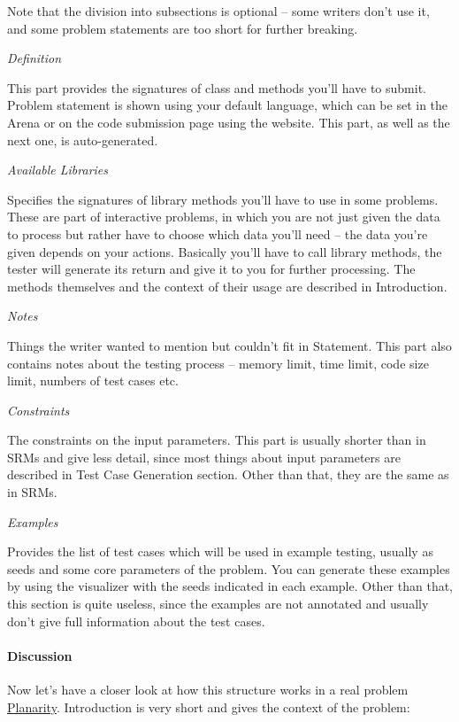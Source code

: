 Note that the division into subsections is optional -- some writers
don't use it, and some problem statements are too short for further
breaking.

\emph{Definition}

This part provides the signatures of class and methods you'll have to
submit. Problem statement is shown using your default language, which
can be set in the Arena or on the code submission page using the
website. This part, as well as the next one, is auto-generated.

\emph{Available Libraries}

Specifies the signatures of library methods you'll have to use in some
problems. These are part of interactive problems, in which you are not
just given the data to process but rather have to choose which data
you'll need -- the data you're given depends on your actions. Basically
you'll have to call library methods, the tester will generate its return
and give it to you for further processing. The methods themselves and
the context of their usage are described in Introduction.

\emph{Notes}

Things the writer wanted to mention but couldn't fit in Statement. This
part also contains notes about the testing process -- memory limit, time
limit, code size limit, numbers of test cases etc.

\emph{Constraints}

The constraints on the input parameters. This part is usually shorter
than in SRMs and give less detail, since most things about input
parameters are described in Test Case Generation section. Other than
that, they are the same as in SRMs.

\emph{Examples}

Provides the list of test cases which will be used in example testing,
usually as seeds and some core parameters of the problem. You can
generate these examples by using the visualizer with the seeds indicated
in each example. Other than that, this section is quite useless, since
the examples are not annotated and usually don't give full information
about the test cases.

\hypertarget{discussion-1}{%
\paragraph{Discussion}\label{discussion-1}}

Now let's have a closer look at how this structure works in a real
problem
\href{http://community.topcoder.com/longcontest/?module=ViewProblemStatement\&rd=14272\&pm=10942}{Planarity}.
Introduction is very short and gives the context of the problem:

